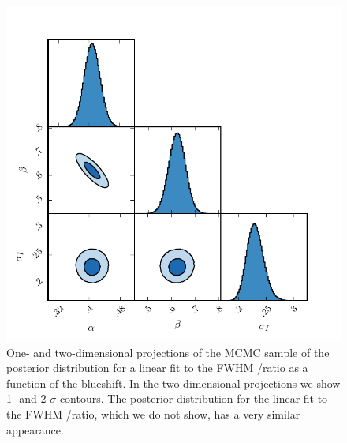 \begin{figure}[h!]
    \includegraphics[width=\textwidth]{figures/chapter03/civ_ha_mcmc_parameters.pdf} 
    \caption[{One- and two-dimensional projections of the MCMC sample of the posterior distribution for a linear fit to the FWHM /\ha ratio as a function of the  blueshift.}]{One- and two-dimensional projections of the MCMC sample of the posterior distribution for a linear fit to the FWHM /\ha ratio as a function of the  blueshift. In the two-dimensional projections we show 1- and 2-$\sigma$ contours. The posterior distribution for the linear fit to the FWHM /\hb ratio, which we do not show, has a very similar appearance.} 
    \label{fig:mcmc_parameters}
\end{figure}

